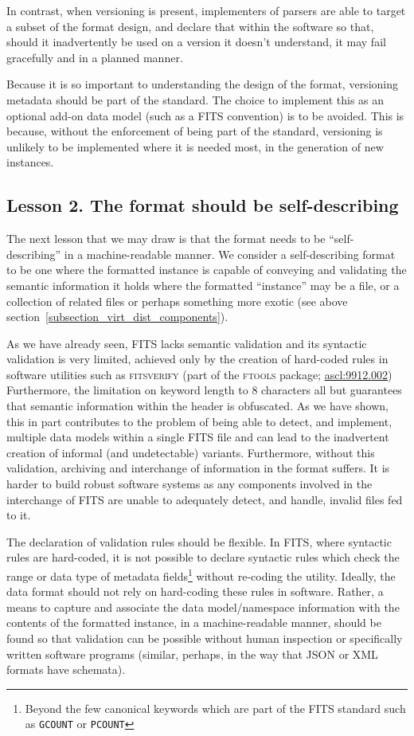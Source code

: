 \documentclass[final,authoryear,5p,times,twocolumn]{elsarticle}
\begin{document}
{{In contrast, when versioning is present, implementers of parsers
are able to target a subset of the format design, and declare
that within the software so that, should it inadvertently be used
on a version it doesn't understand, it may fail gracefully and
in a planned manner.


Because it is so important to understanding the design of
the format, versioning metadata should be part of the standard.
The choice to implement this as an optional add-on data model
(such as a FITS convention) is to be avoided. This is because,
without the enforcement of being part of the standard, versioning
is unlikely to be implemented where it is needed most, in the
generation of new instances.


\subsection{Lesson 2. The format should be self-describing}
\label{section_lesson_2}

The next lesson that we may draw is that the format needs to be
``self-describing'' in a machine-readable manner.
We consider a self-describing format to be one where the formatted
instance is capable of conveying and validating the semantic information
it holds where the formatted ``instance'' may be a file, or a
collection of related files or perhaps something more exotic
(see above section~\ref{subsection_virt_dist_components}).

As we have already seen, FITS lacks semantic validation and its
syntactic validation is very limited, achieved only by the creation
of hard-coded rules in software utilities such as \textsc{fitsverify}
(part of the \textsc{ftools} package; \href{http://ascl.net/9912.002}{ascl:9912.002})
Furthermore, the limitation on
keyword length to 8 characters all but guarantees that semantic
information within the header is obfuscated. As we have shown,
this in part contributes to the problem of being able to detect,
and implement, multiple data models within a single FITS file
and can lead to the inadvertent creation of informal (and
undetectable) variants. Furthermore, without this validation,
archiving and interchange of information in the format suffers.
It is harder to build robust software systems as any components
involved in the interchange of FITS are unable to adequately
detect, and handle, invalid files fed to it.

The declaration of validation rules should be flexible. In FITS,
where syntactic rules are hard-coded, it is not possible to
declare syntactic rules which check the range or data type of
metadata fields\footnote{Beyond the few canonical keywords
which are part of the FITS standard such as \texttt{GCOUNT}
or \texttt{PCOUNT}} without re-coding the utility.
Ideally, the data format should not rely on hard-coding these rules
in software. Rather, a means to capture and associate the data
model/namespace information with the contents of the formatted
instance, in a machine-readable manner, should be found so that
validation can be possible without human inspection or specifically
written software programs (similar, perhaps, in the way that JSON
or XML formats have schemata).


}}
\end{document}
